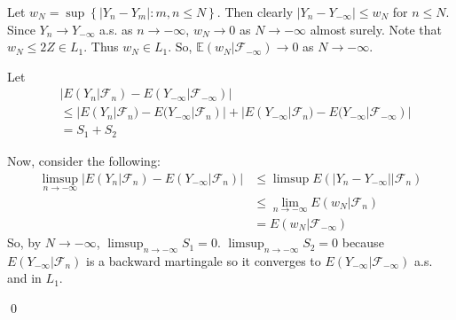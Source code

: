 \begin{problem}[4.7.2] \hfill

	Let $w_N = \sup \left\{ |Y_n - Y_m | : m, n \leq N \right\}$.
	Then clearly $|Y_n - Y_{-\infty} | \leq w_N$ for $n \leq N$.
	Since $Y_n \rightarrow Y_{-\infty}$ a.s. as $n \rightarrow -\infty$,
	$w_N \rightarrow 0$ as $N \rightarrow -\infty$ almost surely.
	Note that $w_N \leq 2Z \in L_1$.
	Thus $w_N \in L_1$.
	So, $\mathbb{E}(w_N | \mathcal{F}_{-\infty}) \rightarrow 0$ as $N\rightarrow -\infty$.

	Let 
	\[
		\begin{split}
			& \left | E(Y_n |\mathcal{F}_n) - E(Y_{-\infty} | \mathcal{F}_{-\infty} ) \right | \\
			& \leq |E(Y_n |\mathcal{F}_n) - E(Y_{-\infty} | \mathcal{F}_n) |
			+ |E(Y_{-\infty} | \mathcal{F}_n ) - E(Y_{-\infty} | \mathcal{F}_{-\infty})| \\
			& = S_1 + S_2
		\end{split}
	\]

	Now, consider the following:
	\[
\begin{split}
	\limsup_{n\rightarrow -\infty} \left | E(Y_n | \mathcal{F}_n) - E(Y_{-\infty} | \mathcal{F}_n) \right |
	& \leq \limsup E(\left | Y_n - Y_{-\infty} \right | | \mathcal{F}_n ) \\
	& \leq \lim_{n \rightarrow -\infty} E(w_N | \mathcal{F}_n) \\
	& = E(w_N |\mathcal{F}_{-\infty})
\end{split}
	\]
	So, by $N \rightarrow -\infty$, $\limsup_{n\rightarrow -\infty} S_1 = 0$.
	$\limsup_{n\rightarrow -\infty} S_2 = 0$ because $E(Y_{-\infty} | \mathcal{F}_n)$ is a backward martingale so it converges to $E(Y_{-\infty}| \mathcal{F}_{-\infty})$ a.s. and in $L_1$.

	\qed
\end{problem}

